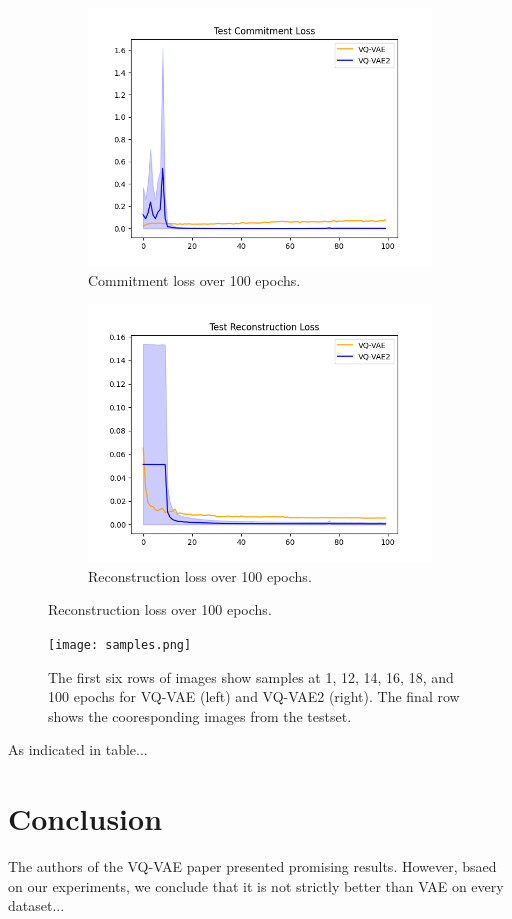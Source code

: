 \documentclass{article}
\begin{document}
\begin{figure}[H]
    \centering
    \begin{subfigure}{.49\linewidth}
        \centering
        \includegraphics[width=\linewidth]{commit.png}
        \caption{Commitment loss over 100 epochs.}
    \end{subfigure}
    \begin{subfigure}{.49\linewidth}
        \centering
        \includegraphics[width=\linewidth]{recon.png}
        \caption{Reconstruction loss over 100 epochs.}
    \end{subfigure}
\end{figure}

\begin{figure}
    \centering
    \texttt{[image: samples.png]}
    \caption{The first six rows of images show samples at 1, 12, 14, 16, 18, and 100 epochs for VQ-VAE (left) and VQ-VAE2 (right). The final row shows the cooresponding images from the testset.}
\end{figure}

As indicated in table...

\section{Conclusion}

The authors of the VQ-VAE paper presented promising results. However, bsaed on our experiments, we conclude that it is not strictly better than VAE on every dataset...
\end{document}
